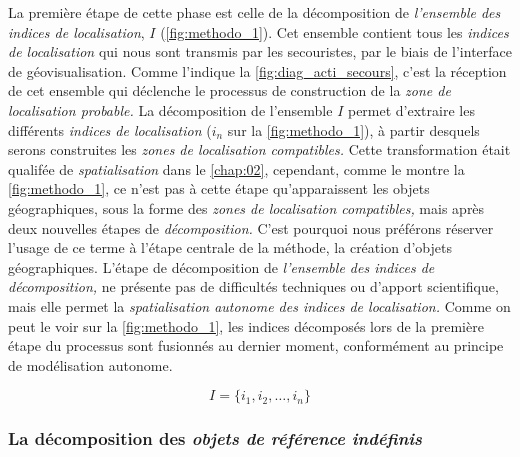 La première étape de cette phase est celle de la décomposition de
\emph{l'ensemble des indices de localisation}, \(I\)
(\autoref{fig:methodo_1}). Cet ensemble contient tous les
\emph{indices de localisation} qui nous sont transmis par les
secouristes, par le biais de l'interface de géovisualisation. Comme
l'indique la \autoref{fig:diag_acti_secours}, c'est la réception de
cet ensemble qui déclenche le processus de construction de la
\emph{zone de localisation probable.} La décomposition de l'ensemble
\(I\) permet d'extraire les différents \emph{indices de localisation}
(\(i_n\) sur la \autoref{fig:methodo_1}), à partir desquels serons
construites les\emph{ zones de localisation compatibles.} Cette
transformation était qualifée de \emph{spatialisation} dans le
\autoref{chap:02}, cependant, comme le montre la
\autoref{fig:methodo_1}, ce n'est pas à cette étape qu'apparaissent
les objets géographiques, sous la forme des \emph{zones de
  localisation compatibles,} mais après deux nouvelles étapes de
\emph{décomposition.} C'est pourquoi nous préférons réserver l'usage
de ce terme à l'étape centrale de la méthode, la création d'objets
géographiques. L'étape de décomposition de \emph{l'ensemble des
  indices de décomposition,} ne présente pas de difficultés techniques
ou d'apport scientifique, mais elle permet la \emph{spatialisation
  autonome des indices de localisation.} Comme on peut le voir sur la
\autoref{fig:methodo_1}, les indices décomposés lors de la première
étape du processus sont fusionnés au dernier moment, conformément au
principe de modélisation autonome.

\begin{equation}
  I = \{i_1, i_2, \dots, i_n \}
\end{equation}

\subsubsection{La décomposition des \emph{objets de référence indéfinis}}

